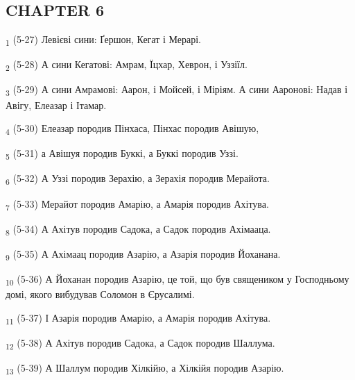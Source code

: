 \subsection{CHAPTER 6}
\begin{tcolorbox}
\textsubscript{1} (5-27) Левієві сини: Ґершон, Кегат і Мерарі.
\end{tcolorbox}
\begin{tcolorbox}
\textsubscript{2} (5-28) А сини Кегатові: Амрам, Їцхар, Хеврон, і Уззіїл.
\end{tcolorbox}
\begin{tcolorbox}
\textsubscript{3} (5-29) А сини Амрамові: Аарон, і Мойсей, і Міріям. А сини Ааронові: Надав і Авігу, Елеазар і Ітамар.
\end{tcolorbox}
\begin{tcolorbox}
\textsubscript{4} (5-30) Елеазар породив Пінхаса, Пінхас породив Авішую,
\end{tcolorbox}
\begin{tcolorbox}
\textsubscript{5} (5-31) а Авішуя породив Буккі, а Буккі породив Уззі.
\end{tcolorbox}
\begin{tcolorbox}
\textsubscript{6} (5-32) А Уззі породив Зерахію, а Зерахія породив Мерайота.
\end{tcolorbox}
\begin{tcolorbox}
\textsubscript{7} (5-33) Мерайот породив Амарію, а Амарія породив Ахітува.
\end{tcolorbox}
\begin{tcolorbox}
\textsubscript{8} (5-34) А Ахітув породив Садока, а Садок породив Ахімааца.
\end{tcolorbox}
\begin{tcolorbox}
\textsubscript{9} (5-35) А Ахімаац породив Азарію, а Азарія породив Йоханана.
\end{tcolorbox}
\begin{tcolorbox}
\textsubscript{10} (5-36) А Йоханан породив Азарію, це той, що був священиком у Господньому домі, якого вибудував Соломон в Єрусалимі.
\end{tcolorbox}
\begin{tcolorbox}
\textsubscript{11} (5-37) І Азарія породив Амарію, а Амарія породив Ахітува.
\end{tcolorbox}
\begin{tcolorbox}
\textsubscript{12} (5-38) А Ахітув породив Садока, а Садок породив Шаллума.
\end{tcolorbox}
\begin{tcolorbox}
\textsubscript{13} (5-39) А Шаллум породив Хілкійю, а Хілкійя породив Азарію.
\end{tcolorbox}
